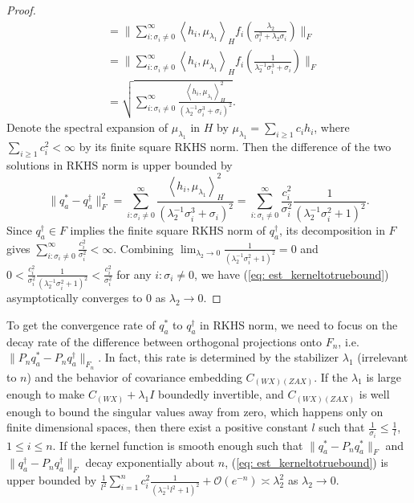 \begin{proof}
\begin{align*}
                                  &= \bigg\|\sum_{i:\sigma_i\neq 0}^{\infty} \left\langle h_i, \mu_{\lambda_1}\right\rangle _H f_i (\frac{\lambda_2}{\sigma_i^3+\lambda_2\sigma_i})\bigg\|_F \\
                                  &= \bigg\|\sum_{i:\sigma_i\neq 0}^{\infty} \left\langle h_i, \mu_{\lambda_1}\right\rangle _H f_i (\frac{1}{\lambda_2^{-1}\sigma_i^3+\sigma_i})\bigg\|_F \\
                                  &= \sqrt{\sum_{i:\sigma_i \neq0}^{\infty}\frac{\left\langle h_i, \mu_{\lambda_1}\right\rangle^2_H}{(\lambda_2^{-1}\sigma_i^3+\sigma_i)^2}}. 
    \end{align*}
    Denote the spectral expansion of $\mu_{\lambda_1}$ in $H$ by $\mu_{\lambda_1}=\sum_{i\geq 1}c_i h_i$, where $\sum_{i\geq 1}c_i^2<\infty$ by its finite square RKHS norm. 
    Then the difference of the two solutions in RKHS norm is upper bounded by  
    \begin{equation}
        \label{eq: est_kerneltotruebound}
        \|q_a^*-q_a^{\dagger}\|^2_F = \sum_{i:\sigma_i \neq0}^{\infty}\frac{\left\langle h_i, \mu_{\lambda_1}\right\rangle^2_H}{(\lambda_2^{-1}\sigma_i^3+\sigma_i)^2} = \sum_{i:\sigma_i \neq0}^{\infty}\frac{c_i^2}{\sigma_i^2} \frac{1}{(\lambda_2^{-1}\sigma^2_i+1)^2}. 
    \end{equation}
    Since $q_a^{\dagger}\in F$ implies the finite square RKHS norm of $q_a^{\dagger}$, its decomposition in $F$ gives $\sum_{i:\sigma_i\neq0}^{\infty} \frac{c_i^2}{\sigma_i^2}<\infty$. 
    Combining $\lim_{\lambda_2\rightarrow0}\frac{1}{(\lambda_2^{-1}\sigma^2_i+1)^2}=0$ and $0<\frac{c_i^2}{\sigma_i^2} \frac{1}{(\lambda_2^{-1}\sigma^2_i+1)^2} <\frac{c_i^2}{\sigma_i^2}$ for any $i:\sigma_i\neq0$,  
    we have (\ref{eq: est_kerneltotruebound}) asymptotically converges to 0 as $\lambda_2\rightarrow0$. 
\end{proof}

\begin{remark}
    \label{rem: est_ratekernelembeddedtotrue}
    To get the convergence rate of $q_a^*$ to $q_a^{\dagger}$ in RKHS norm, 
    we need to focus on the decay rate of the difference between orthogonal projections onto $F_n$, 
    i.e. $\|P_nq^*_a-P_nq_a^{\dagger}\|_{F_n}$.
    In fact, this rate is determined by the stabilizer $\lambda_1$ (irrelevant to $n$) and the behavior of covariance embedding $C_{(WX)(ZAX)}$. 
    If the $\lambda_1$ is large enough to make $C_{(WX)}+\lambda_1I$ boundedly invertible, 
    and $C_{(WX)(ZAX)}$ is well enough to bound the singular values away from zero, 
    which happens only on finite dimensional spaces, 
    then there exist a positive constant $l$ such that $\frac{1}{\sigma_i}\leq\frac{1}{l}$, $1\leq i\leq n$. 
    If the kernel function is smooth enough such that $\|q_a^*-P_nq^*_a\|_F$ and $\|q_a^{\dagger}-P_nq_a^{\dagger}\|_F$ decay exponentially about $n$, 
    (\ref{eq: est_kerneltotruebound}) is upper bounded by $\frac{1}{l^2}\sum_{i=1}^{n}c_i^2\frac{1}{(\lambda_2^{-1}l^2+1)^2}+\mathcal{O}(e^{-n})\asymp\lambda_2^2$ as $\lambda_2\rightarrow 0$.
\end{remark}

